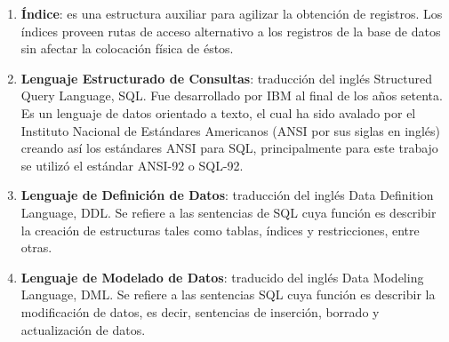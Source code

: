 \begin{enumerate}
	\item \textbf{Índice}: es una estructura auxiliar para agilizar la obtención de registros. Los índices proveen rutas de acceso alternativo a los registros de la base de datos sin afectar la colocación física de éstos\cite{FundamentalsOfDBSystems}.
	\item \textbf{Lenguaje Estructurado de Consultas}: traducción del inglés Structured Query Language, SQL. Fue desarrollado por IBM\textsuperscript{\textcopyright} al final de los años setenta. Es un lenguaje de datos orientado a texto, el cual ha sido avalado por el Instituto Nacional de Estándares Americanos (ANSI por sus siglas en inglés) creando así los estándares ANSI para SQL, principalmente para este trabajo se utilizó el estándar ANSI-92 o SQL-92.
	\item \textbf{Lenguaje de Definición de Datos}: traducción del inglés Data Definition Language, DDL. Se refiere a las sentencias de SQL cuya función es describir la creación de estructuras tales como tablas, índices y restricciones, entre otras\cite{DataBaseConcepts}.
	\item \textbf{Lenguaje de Modelado de Datos}: traducido del inglés Data Modeling Language, DML. Se refiere a las sentencias SQL cuya función es describir la modificación de datos, es decir, sentencias de inserción, borrado y actualización de datos\cite{DataBaseConcepts}.  
\end{enumerate}


